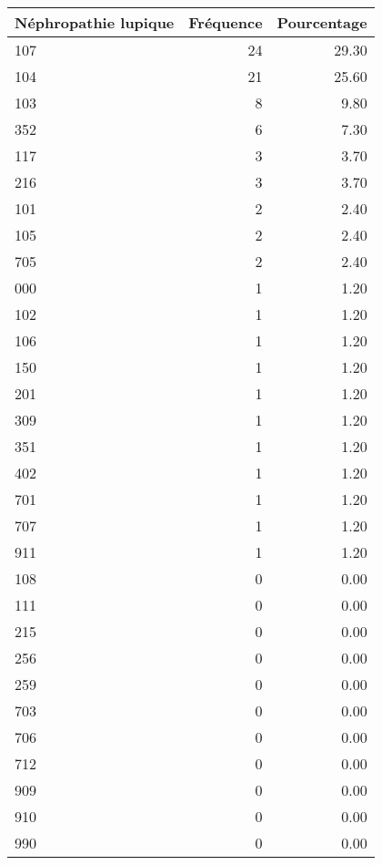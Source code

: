 \documentclass[11pt,a4paper]{article}\usepackage[]{graphicx}\usepackage[]{color}
\begin{document}
\begin{table}[H]
\centering
\begin{tabular}{lrr}
  \hline
Néphropathie lupique & Fréquence & Pourcentage \\ 
  \hline
107 &  24 & 29.30 \\ 
  104 &  21 & 25.60 \\ 
  103 &   8 & 9.80 \\ 
  352 &   6 & 7.30 \\ 
  117 &   3 & 3.70 \\ 
  216 &   3 & 3.70 \\ 
  101 &   2 & 2.40 \\ 
  105 &   2 & 2.40 \\ 
  705 &   2 & 2.40 \\ 
  000 &   1 & 1.20 \\ 
  102 &   1 & 1.20 \\ 
  106 &   1 & 1.20 \\ 
  150 &   1 & 1.20 \\ 
  201 &   1 & 1.20 \\ 
  309 &   1 & 1.20 \\ 
  351 &   1 & 1.20 \\ 
  402 &   1 & 1.20 \\ 
  701 &   1 & 1.20 \\ 
  707 &   1 & 1.20 \\ 
  911 &   1 & 1.20 \\ 
  108 &   0 & 0.00 \\ 
  111 &   0 & 0.00 \\ 
  215 &   0 & 0.00 \\ 
  256 &   0 & 0.00 \\ 
  259 &   0 & 0.00 \\ 
  703 &   0 & 0.00 \\ 
  706 &   0 & 0.00 \\ 
  712 &   0 & 0.00 \\ 
  909 &   0 & 0.00 \\ 
  910 &   0 & 0.00 \\ 
  990 &   0 & 0.00 \\ 
   \hline
\end{tabular}
\end{table}
\end{document}
